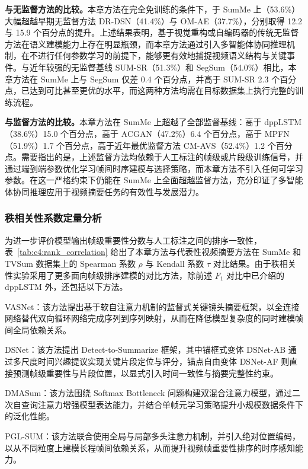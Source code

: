 \textbf{与无监督方法的比较。}\enspace 本章方法在完全免训练的条件下，于 SumMe 上（53.6\%）大幅超越早期无监督方法 DR-DSN（41.4\%）与 OM-AE（37.7\%），分别取得 12.2 与 15.9 个百分点的提升。上述结果表明，基于视觉重构或自编码器的传统无监督方法在语义建模能力上存在明显瓶颈，而本章方法通过引入多智能体协同推理机制，在不进行任何参数学习的前提下，能够更有效地捕捉视频语义结构与关键事件。与近年较强的无监督基线 SUM-SR（51.3\%）和 SegSum（54.0\%）相比，本章方法在 SumMe 上与 SegSum 仅差 0.4 个百分点，并高于 SUM-SR 2.3 个百分点，已达到可比甚至更优的水平，而这两种方法均需在目标数据集上执行完整的训练流程。

\textbf{与监督方法的比较。}\enspace 本章方法在 SumMe 上超越了全部监督基线：高于 dppLSTM（38.6\%）15.0 个百分点，高于 ACGAN（47.2\%）6.4 个百分点，高于 MPFN（51.9\%）1.7 个百分点，高于近年最优监督方法 CM-AVS（52.4\%）1.2 个百分点。需要指出的是，上述监督方法均依赖于人工标注的帧级或片段级训练信号，并通过端到端参数优化学习帧间时序建模与选择策略，而本章方法不引入任何可学习参数。在这一严格约束下仍能在 SumMe 上全面超越监督方法，充分印证了多智能体协同推理应用于视频摘要任务的有效性与发展潜力。

\subsubsection{秩相关性系数定量分析}

为进一步评价模型输出帧级重要性分数与人工标注之间的排序一致性，表~\ref{tab:c4:rank_correlation} 给出了本章方法与代表性视频摘要方法在 SumMe 和 TVSum 数据集上的 Spearman 系数 $\rho$ 与 Kendall 系数 $\tau$ 对比结果。由于秩相关性实验采用了更多面向帧级排序建模的对比方法，除前述 $F_1$ 对比中已介绍的 dppLSTM 外，还包括以下方法。

VASNet\cite{fajtl2018summarizing}：该方法提出基于软自注意力机制的监督式关键镜头摘要框架，以全连接网络替代双向循环网络完成序列到序列映射，从而在降低模型复杂度的同时建模帧间全局依赖关系。

DSNet\cite{zhu2020dsnet}：该方法提出 Detect-to-Summarize 框架，其中锚框式变体 DSNet-AB 通过多尺度时间兴趣提议实现关键片段定位与评分，锚点自由变体 DSNet-AF 则直接预测帧级重要性与片段位置，以显式引入时间一致性与摘要完整性约束。

DMASum\cite{wang2020query}：该方法围绕 Softmax Bottleneck 问题构建双混合注意力模型，通过二次自查询注意力增强模型表达能力，并结合单帧元学习策略提升小规模数据条件下的泛化性能。

PGL-SUM\cite{apostolidis2021combining}：该方法联合使用全局与局部多头注意力机制，并引入绝对位置编码，以从不同粒度上建模长程帧间依赖关系，从而提升视频帧重要性排序的时序感知能力。

